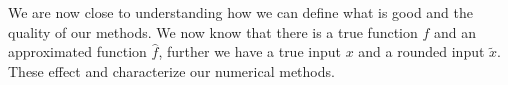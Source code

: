 
 We are now close to understanding how we can define what is good and the quality of our methods. 
We now know that there is a true function $f$ and an approximated function $\hat{f}$,
further we have a true input $x$ and a rounded input $\tilde{x}$. These effect and characterize our numerical methods.













































